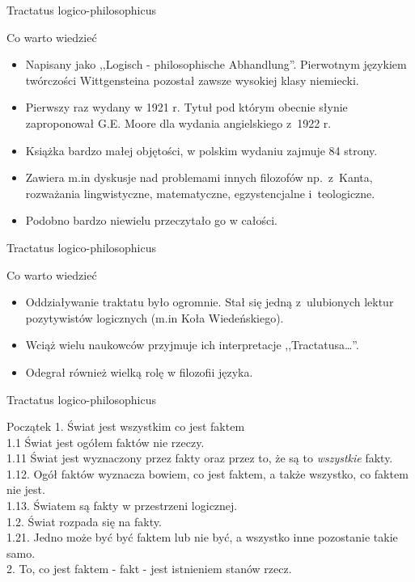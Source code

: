 \begin{frame}{Tractatus logico-philosophicus}
\begin{block}{Co warto wiedzieć}
\begin{itemize}
\item Napisany jako ,,Logisch - philosophische Abhandlung''. Pierwotnym językiem twórczości Wittgensteina pozostał zawsze wysokiej klasy niemiecki.
\item Pierwszy raz wydany w 1921 r. Tytuł pod którym obecnie słynie zaproponował G.E. Moore dla wydania angielskiego z~1922 r.
\item Książka bardzo małej objętości, w polskim wydaniu zajmuje 84 strony.
\item Zawiera m.in dyskusje nad problemami innych filozofów np.~z~Kanta, rozważania lingwistyczne, matematyczne, egzystencjalne i~teologiczne.
\item Podobno bardzo niewielu przeczytało go w całości.
\end{itemize}
\end{block}
\end{frame}

\begin{frame}{Tractatus logico-philosophicus}
\begin{block}{Co warto wiedzieć}
\begin{itemize}
\item Oddziaływanie traktatu było ogromnie. Stał się jedną z~ulubionych lektur pozytywistów logicznych (m.in Koła Wiedeńskiego).
\item Wciąż wielu naukowców przyjmuje ich interpretacje ,,Tractatusa\ldots ''.
\item Odegrał również wielką rolę w filozofii języka.
\end{itemize}
\end{block}
\end{frame}

\begin{frame}{Tractatus logico-philosophicus}
\begin{block}{Początek}
1. Świat jest wszystkim co jest faktem\\
1.1 Świat jest ogółem faktów nie rzeczy.\\
1.11 Świat jest wyznaczony przez fakty oraz przez to, że są to \emph{wszystkie} fakty.\\
1.12. Ogół faktów wyznacza bowiem, co jest faktem, a także wszystko, co faktem nie jest.\\
1.13. Światem są fakty w przestrzeni logicznej.\\
1.2. Świat rozpada się na fakty.\\
1.21. Jedno może być być faktem lub nie być, a wszystko inne pozostanie takie samo.\\
2. To, co jest faktem - fakt - jest istnieniem stanów rzecz.
\end{block}
\end{frame}

